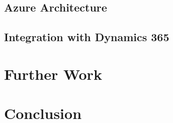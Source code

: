 \subsection{Azure Architecture}
\lipsum[2]

\subsection{Integration with Dynamics 365}
\lipsum[3]


\section{Further Work} \label{sec:use-case-further-work}
\lipsum[1]

\section{Conclusion} \label{sec:use-case-conclusion}
\lipsum[1]